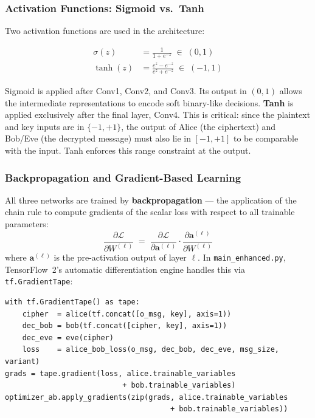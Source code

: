 \documentclass[12pt, a4paper]{article}
\newcommand{\code}[1]{\texttt{\color{CodeRed}#1}}
\begin{document}
\subsubsection*{Activation Functions: Sigmoid vs.\ Tanh}

Two activation functions are used in the architecture:

\begin{align}
  \sigma(z) &= \frac{1}{1 + e^{-z}} \;\in\; (0, 1)
  \label{eq:sigmoid} \\[6pt]
  \tanh(z)  &= \frac{e^z - e^{-z}}{e^z + e^{-z}} \;\in\; (-1, 1)
  \label{eq:tanh}
\end{align}

Sigmoid is applied after Conv1, Conv2, and Conv3. Its output in $(0,1)$
allows the intermediate representations to encode soft binary-like
decisions. \textbf{Tanh} is applied exclusively after the final layer,
Conv4. This is critical: since the plaintext and key inputs are in
$\{-1,+1\}$, the output of Alice (the ciphertext) and Bob/Eve
(the decrypted message) must also lie in $[-1,+1]$ to be comparable
with the input. Tanh enforces this range constraint at the output.

\subsubsection*{Backpropagation and Gradient-Based Learning}

All three networks are trained by \textbf{backpropagation} — the
application of the chain rule to compute gradients of the scalar loss
with respect to all trainable parameters:
%
\begin{equation}
  \frac{\partial \mathcal{L}}{\partial W^{(\ell)}}
  \;=\;
  \frac{\partial \mathcal{L}}{\partial \mathbf{a}^{(\ell)}}
  \cdot
  \frac{\partial \mathbf{a}^{(\ell)}}{\partial W^{(\ell)}}
  \label{eq:backprop}
\end{equation}
%
where $\mathbf{a}^{(\ell)}$ is the pre-activation output of layer $\ell$.
In \code{main\_enhanced.py}, TensorFlow~2's automatic differentiation
engine handles this via \code{tf.GradientTape}:
\newpage
\begin{lstlisting}[caption={Gradient computation using \code{tf.GradientTape}}]
with tf.GradientTape() as tape:
    cipher  = alice(tf.concat([o_msg, key], axis=1))
    dec_bob = bob(tf.concat([cipher, key], axis=1))
    dec_eve = eve(cipher)
    loss    = alice_bob_loss(o_msg, dec_bob, dec_eve, msg_size, variant)
grads = tape.gradient(loss, alice.trainable_variables
                           + bob.trainable_variables)
optimizer_ab.apply_gradients(zip(grads, alice.trainable_variables
                                      + bob.trainable_variables))
\end{lstlisting}
\end{document}

